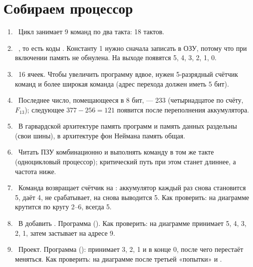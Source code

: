 \section*{Собираем процессор}
\begin{enumerate}
  \item {}~Цикл занимает 9 команд по два такта: 18 тактов.
  \item {}~, то есть коды . Константу 1 нужно сначала записать в ОЗУ, потому что при включении память не обнулена. На выходе появятся 5, 4, 3, 2, 1, 0.
  \item {}~16 ячеек. Чтобы увеличить программу вдвое, нужен 5-разрядный счётчик команд и более широкая команда (адрес перехода должен иметь 5 бит).
  \item {}~Последнее число, помещающееся в 8 бит, --- 233 (четырнадцатое по счёту, $F_{13}$); следующее $377 - 256 = 121$ появится после переполнения аккумулятора.
  \item {}~В гарвардской архитектуре память программ и память данных раздельны (свои шины), в архитектуре фон Неймана память общая.
  \item {}~Читать ПЗУ комбинационно и выполнять команду в том же такте (одноцикловый процессор); критический путь при этом станет длиннее, а частота ниже.
  \item {}~Команда  возвращает счётчик на : аккумулятор каждый раз снова становится 5,  даёт 4,  не срабатывает, на  снова выводится 5. Как проверить: на диаграмме  крутится по кругу 2--6,  всегда 5.
  \item {}~В  добавить . Программа  (). Как проверить: на диаграмме  принимает 5, 4, 3, 2, 1, затем  застывает на адресе 9.
  \item {}~Проект. Программа  ():  принимает 3, 2, 1 и в конце 0, после чего  перестаёт меняться. Как проверить: на диаграмме после третьей «попытки»  и .
\end{enumerate}

